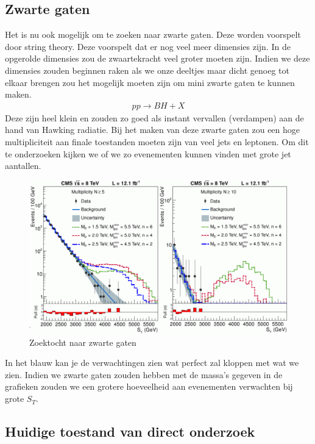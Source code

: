 \documentclass[../main.tex]{subfiles}
\begin{document}
\subsection{Zwarte gaten}%
\label{sub:zwarte_gaten}

Het is nu ook mogelijk om te zoeken naar zwarte gaten. Deze worden voorspelt door string theory. Deze voorspelt dat er nog veel meer dimensies zijn. In de opgerolde dimensies zou de zwaartekracht veel groter moeten zijn. Indien we deze dimensies zouden beginnen raken als we onze deeltjes maar dicht genoeg tot elkaar brengen zou het mogelijk moeten zijn om mini zwarte gaten te kunnen maken.
\begin{equation}
    \begin{aligned}
        \label{eq:zwarte_gaten}
        p p \rightarrow B H+X
    \end{aligned}
\end{equation}
Deze zijn heel klein en zouden zo goed als instant vervallen (verdampen) aan de hand van Hawking radiatie. Bij het maken van deze zwarte gaten zou een hoge multipliciteit aan finale toestanden moeten zijn van veel jets en leptonen. Om dit te onderzoeken kijken we of we zo evenementen kunnen vinden met grote jet aantallen.
\begin{figure}[h]
    \centering
    \includegraphics[width=0.6\linewidth]{physics_beyond_the_standard_model/zwarte_gaten.png}
    \caption{Zoektocht naar zwarte gaten}%
    \label{fig:physics_}
\end{figure}

In het blauw kan je de verwachtingen zien wat perfect zal kloppen met wat we zien. Indien we zwarte gaten zouden hebben met de massa's gegeven in de grafieken zouden we een grotere hoeveelheid aan evenementen verwachten bij grote $S_T$.

\subsection{Huidige toestand van direct onderzoek}%
\label{sub:huidige_toestand_van_direct_onderzoek}
\end{document}
